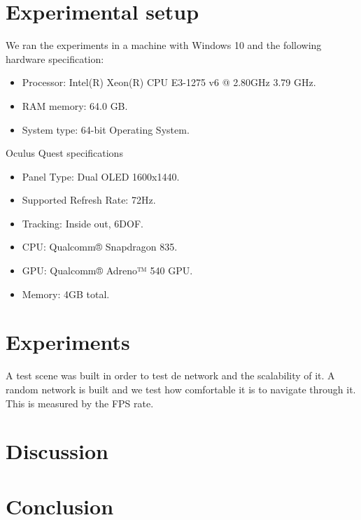 \section{Experimental setup}
We ran the experiments in a machine with Windows 10 and the following hardware specification:
\begin{itemize}
  \item Processor: Intel(R) Xeon(R) CPU E3-1275 v6 @ 2.80GHz 3.79 GHz.
  \item RAM memory: 64.0 GB.
  \item System type: 64-bit Operating System.
\end{itemize}

Oculus Quest specifications
\begin{itemize}
  \item Panel Type: Dual OLED 1600x1440.
  \item Supported Refresh Rate: 72Hz.
  \item Tracking: Inside out, 6DOF.
  \item CPU: Qualcomm® Snapdragon 835.
  \item GPU: Qualcomm® Adreno™ 540 GPU.
  \item Memory: 4GB total.
\end{itemize}

\section{Experiments}
A test scene was built in order to test de network and the scalability of it. A random network is built and we test how comfortable it is to navigate through it. This is measured by the FPS rate.

\section{Discussion}

\section{Conclusion}
